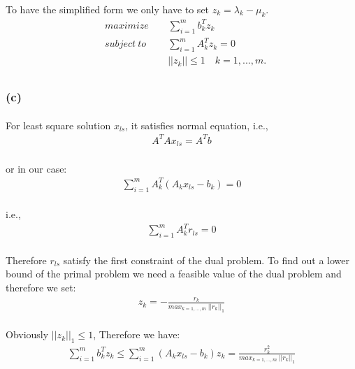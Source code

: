 \documentclass[12pt]{article}
\begin{document}
\paragraph*{}
To have the simplified form we only have to set $z_k = \lambda_k -\mu_k$.
\begin{align*}
&maximize \qquad \sum_{i = 1}^{m} b_k^Tz_k\\
&subject \ to \qquad  \ \sum_{i = 1}^{m} A_k^Tz_k = 0\\
& \qquad \qquad \qquad  \ \  ||z_k|| \leq 1 \quad k = 1,...,m.\\
\end{align*}
%
\subsubsection*{(c)}
\paragraph*{}
For least square solution $x_{ls}$, it satisfies normal equation, i.e.,
\begin{align*}
A^T Ax_{ls} = A^T b
\end{align*}
%
\paragraph*{}
or in our case:
\begin{align*}
\sum_{i = 1}^{m} A_k^T(A_kx_{ls}-b_k) = 0
\end{align*}
\paragraph*{}
i.e.,
\begin{align*}
\sum_{i = 1}^{m} A_k^Tr_{ls} = 0
\end{align*}
%
\paragraph*{}
Therefore $r_{ls}$ satisfy the first constraint of the dual problem. To find out a lower bound of the primal problem we need a feasible value of the dual problem and therefore we set:
\begin{align*}
z_k =- \frac{r_k}{max_{k = 1,...,m} \ ||r_k||_1}
\end{align*}
\paragraph*{}
Obviously $||z_k||_1 \leq 1$, Therefore we have:
\begin{align*}
\sum_{i = 1}^{m} b_k^Tz_k \leq \sum_{i = 1}^{m} (A_kx_{ls} - b_k)z_k = \frac{r_k^2}{max_{k = 1,...,m} \ ||r_k||_1}
\end{align*}
%
\end{document}
